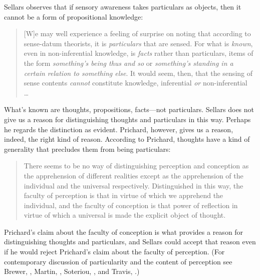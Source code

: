 \documentclass[12pt]{article}
\begin{document}
Sellars observes that if sensory awareness takes particulars as objects, then it cannot be a form of propositional knowledge:
\begin{quote}
	[W]e may well experience a feeling of surprise on noting that according to sense-datum theorists, it is \emph{particulars} that are sensed. For what is \emph{known}, even in non-inferential knowledge, is \emph{facts} rather than particulars, items of the form \emph{something's being thus and so} or \emph{something's standing in a certain relation to something else}. It would seem, then, that the sensing of sense contents \emph{cannot} constitute knowledge, inferential \emph{or} non-inferential \ldots\ \citep[§3]{Sellars:1956xp}
\end{quote}
What's known are thoughts, propositions, facts\----\-not par\-ti\-cu\-lars. Sellars does not give us a reason for distinguishing thoughts and particulars in this way. Perhaps he regards the distinction as evident. Prichard, however, gives us a reason, indeed, the right kind of reason. According to Prichard, thoughts have a kind of generality that precludes them from being particulars:
\begin{quote}
	There seems to be no way of distinguishing perception and conception as the apprehension of different realities except as the apprehension of the individual and the universal respectively. Distinguished in this way, the faculty of perception is that in virtue of which we apprehend the individual, and the faculty of conception is that power of reflection in virtue of which a universal is made the explicit object of thought. \citep[]{Prichard:1909yg}
\end{quote}
Prichard's claim about the faculty of conception is what provides a reason for distinguishing thoughts and particulars, and Sellars could accept that reason even if he would reject Prichard's claim about the faculty of perception. (For contemporary discussion of particularity and the content of perception see Brewer, \citeyear{Brewer:2008fk}, Martin, \citeyear{Martin:2002jb}, Soteriou, \citeyear{Soteriou:2000iz,Soteriou:2005fk}, and Travis, \citeyear{Travis:2005ys}.)
\end{document}
